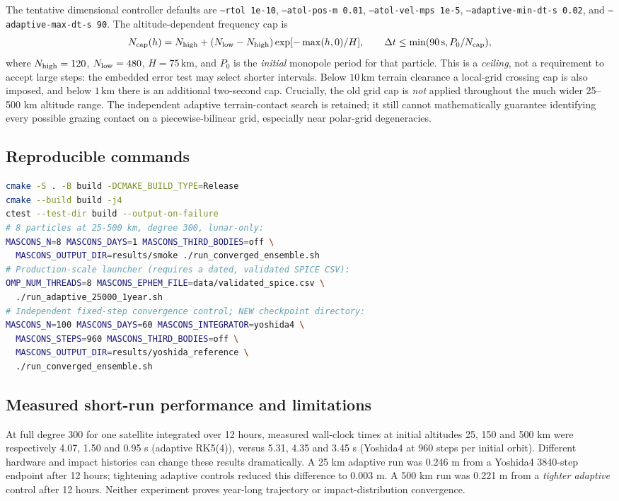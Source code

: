 \documentclass[11pt,a4paper]{article}
\newcommand{\opt}[1]{\texttt{#1}}
\begin{document}
The tentative dimensional controller defaults are
\opt{--rtol 1e-10}, \opt{--atol-pos-m 0.01},
\opt{--atol-vel-mps 1e-5}, \opt{--adaptive-min-dt-s 0.02}, and
\opt{--adaptive-max-dt-s 90}. The altitude-dependent frequency cap is
\begin{equation}
N_{\rm cap}(h)=N_{\rm high}+(N_{\rm low}-N_{\rm high})
\exp[-\max(h,0)/H],\qquad
\Delta t\le\min(90\,\mathrm{s},P_0/N_{\rm cap}),
\end{equation}
where $N_{\rm high}=120$, $N_{\rm low}=480$, $H=75\,\mathrm{km}$,
and $P_0$ is the \emph{initial} monopole period for that particle.
This is a \emph{ceiling}, not a requirement to accept large steps: the embedded
error test may select shorter intervals. Below $10\,\mathrm{km}$ terrain
clearance a local-grid crossing cap is also imposed, and below $1\,\mathrm{km}$
there is an additional two-second cap. Crucially, the old grid cap is
\emph{not} applied throughout the much wider 25--500 km altitude range.
The independent adaptive terrain-contact search is retained; it still
cannot mathematically guarantee identifying every possible grazing contact
on a piecewise-bilinear grid, especially near polar-grid degeneracies.

\subsection{Reproducible commands}
\begin{lstlisting}[language=bash]
cmake -S . -B build -DCMAKE_BUILD_TYPE=Release
cmake --build build -j4
ctest --test-dir build --output-on-failure
# 8 particles at 25-500 km, degree 300, lunar-only:
MASCONS_N=8 MASCONS_DAYS=1 MASCONS_THIRD_BODIES=off \
  MASCONS_OUTPUT_DIR=results/smoke ./run_converged_ensemble.sh
# Production-scale launcher (requires a dated, validated SPICE CSV):
OMP_NUM_THREADS=8 MASCONS_EPHEM_FILE=data/validated_spice.csv \
  ./run_adaptive_25000_1year.sh
# Independent fixed-step convergence control; NEW checkpoint directory:
MASCONS_N=100 MASCONS_DAYS=60 MASCONS_INTEGRATOR=yoshida4 \
  MASCONS_STEPS=960 MASCONS_THIRD_BODIES=off \
  MASCONS_OUTPUT_DIR=results/yoshida_reference \
  ./run_converged_ensemble.sh
\end{lstlisting}

\subsection{Measured short-run performance and limitations}
At full degree 300 for one satellite integrated over 12 hours, measured
wall-clock times at initial altitudes 25, 150 and 500 km were respectively
4.07, 1.50 and 0.95 s (adaptive RK5(4)), versus 5.31, 4.35 and 3.45 s
(Yoshida4 at 960 steps per initial orbit). Different hardware and impact
histories can change these results dramatically. A 25 km adaptive run was
0.246 m from a Yoshida4 3840-step endpoint after 12 hours; tightening
adaptive controls reduced this difference to 0.003 m. A 500 km run was
0.221 m from a \emph{tighter adaptive} control after 12 hours. Neither
experiment proves year-long trajectory or impact-distribution convergence.
\end{document}
